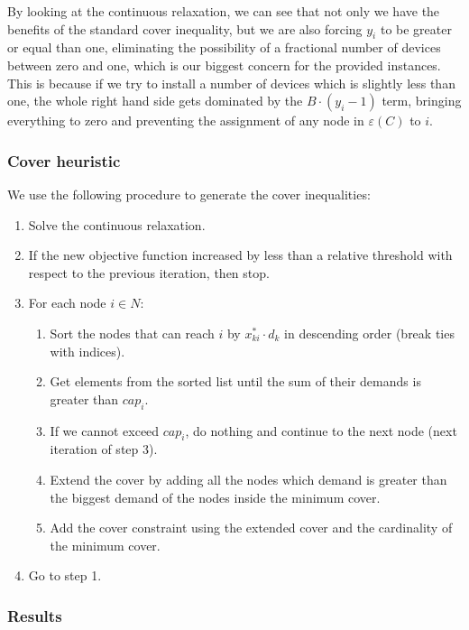 By looking at the continuous relaxation, we can see that not only we have the benefits of the standard cover inequality, but we are also forcing $y_i$ to be greater or equal than one, eliminating the possibility of a fractional number of devices between zero and one, which is our biggest concern for the provided instances. This is because if we try to install a number of devices which is slightly less than one, the whole right hand side gets dominated by the $B \cdot (y_i - 1)$ term, bringing everything to zero and preventing the assignment of any node in $\varepsilon(C)$ to $i$.

\newpage
\subsubsection*{Cover heuristic}

We use the following procedure to generate the cover inequalities:
\begin{enumerate}
	\item Solve the continuous relaxation.
	\item If the new objective function increased by less than a relative threshold with respect to the previous iteration, then stop.
	\item For each node $i \in N$:
	\begin{enumerate}[label*=\arabic*.]
		\item Sort the nodes that can reach $i$ by $x^*_{ki} \cdot d_k$ in descending order (break ties with indices).
		\item Get elements from the sorted list until the sum of their demands is greater than $cap_i$.
		\item If we cannot exceed $cap_i$, do nothing and continue to the next node (next iteration of step 3).
		\item Extend the cover by adding all the nodes which demand is greater than the biggest demand of the nodes inside the minimum cover.
		\item Add the cover constraint using the extended cover and the cardinality of the minimum cover.
	\end{enumerate}
	\item Go to step 1.
\end{enumerate}

\newpage
\subsubsection*{Results}

